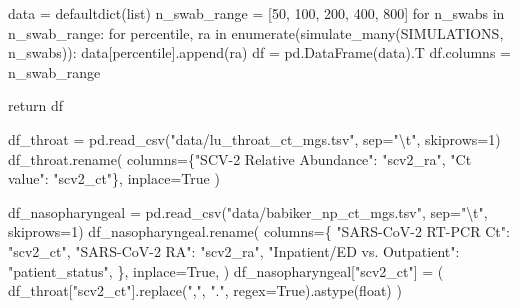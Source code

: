 \documentclass[
  letterpaper,
  DIV=11,
  numbers=noendperiod]{scrartcl}
\newenvironment{Shaded}{\begin{snugshade}}{\end{snugshade}}
\newcommand{\BuiltInTok}[1]{\textcolor[rgb]{0.00,0.23,0.31}{#1}}
\newcommand{\CharTok}[1]{\textcolor[rgb]{0.13,0.47,0.30}{#1}}
\newcommand{\ControlFlowTok}[1]{\textcolor[rgb]{0.00,0.23,0.31}{#1}}
\newcommand{\DecValTok}[1]{\textcolor[rgb]{0.68,0.00,0.00}{#1}}
\newcommand{\KeywordTok}[1]{\textcolor[rgb]{0.00,0.23,0.31}{#1}}
\newcommand{\NormalTok}[1]{\textcolor[rgb]{0.00,0.23,0.31}{#1}}
\newcommand{\OperatorTok}[1]{\textcolor[rgb]{0.37,0.37,0.37}{#1}}
\newcommand{\StringTok}[1]{\textcolor[rgb]{0.13,0.47,0.30}{#1}}
\newcommand{\VariableTok}[1]{\textcolor[rgb]{0.07,0.07,0.07}{#1}}
\begin{document}
\begin{Shaded}
\begin{Highlighting}[]
\NormalTok{    data }\OperatorTok{=}\NormalTok{ defaultdict(}\BuiltInTok{list}\NormalTok{)}
\NormalTok{    n\_swab\_range }\OperatorTok{=}\NormalTok{ [}\DecValTok{50}\NormalTok{, }\DecValTok{100}\NormalTok{, }\DecValTok{200}\NormalTok{, }\DecValTok{400}\NormalTok{, }\DecValTok{800}\NormalTok{]}
    \ControlFlowTok{for}\NormalTok{ n\_swabs }\KeywordTok{in}\NormalTok{ n\_swab\_range:}
        \ControlFlowTok{for}\NormalTok{ percentile, ra }\KeywordTok{in} \BuiltInTok{enumerate}\NormalTok{(simulate\_many(SIMULATIONS, n\_swabs)):}
\NormalTok{            data[percentile].append(ra)}
\NormalTok{    df }\OperatorTok{=}\NormalTok{ pd.DataFrame(data).T}
\NormalTok{    df.columns }\OperatorTok{=}\NormalTok{ n\_swab\_range}

    \ControlFlowTok{return}\NormalTok{ df}


\NormalTok{df\_throat }\OperatorTok{=}\NormalTok{ pd.read\_csv(}\StringTok{"data/lu\_throat\_ct\_mgs.tsv"}\NormalTok{, sep}\OperatorTok{=}\StringTok{"}\CharTok{\textbackslash{}t}\StringTok{"}\NormalTok{, skiprows}\OperatorTok{=}\DecValTok{1}\NormalTok{)}
\NormalTok{df\_throat.rename(}
\NormalTok{    columns}\OperatorTok{=}\NormalTok{\{}\StringTok{"SCV{-}2 Relative Abundance"}\NormalTok{: }\StringTok{"scv2\_ra"}\NormalTok{, }\StringTok{"Ct value"}\NormalTok{: }\StringTok{"scv2\_ct"}\NormalTok{\}, inplace}\OperatorTok{=}\VariableTok{True}
\NormalTok{)}

\NormalTok{df\_nasopharyngeal }\OperatorTok{=}\NormalTok{ pd.read\_csv(}\StringTok{"data/babiker\_np\_ct\_mgs.tsv"}\NormalTok{, sep}\OperatorTok{=}\StringTok{"}\CharTok{\textbackslash{}t}\StringTok{"}\NormalTok{, skiprows}\OperatorTok{=}\DecValTok{1}\NormalTok{)}
\NormalTok{df\_nasopharyngeal.rename(}
\NormalTok{    columns}\OperatorTok{=}\NormalTok{\{}
        \StringTok{"SARS{-}CoV{-}2 RT{-}PCR Ct"}\NormalTok{: }\StringTok{"scv2\_ct"}\NormalTok{,}
        \StringTok{"SARS{-}CoV{-}2 RA"}\NormalTok{: }\StringTok{"scv2\_ra"}\NormalTok{,}
        \StringTok{"Inpatient/ED vs. Outpatient"}\NormalTok{: }\StringTok{"patient\_status"}\NormalTok{,}
\NormalTok{    \},}
\NormalTok{    inplace}\OperatorTok{=}\VariableTok{True}\NormalTok{,}
\NormalTok{)}
\NormalTok{df\_nasopharyngeal[}\StringTok{"scv2\_ct"}\NormalTok{] }\OperatorTok{=}\NormalTok{ (}
\NormalTok{    df\_throat[}\StringTok{"scv2\_ct"}\NormalTok{].replace(}\StringTok{","}\NormalTok{, }\StringTok{"."}\NormalTok{, regex}\OperatorTok{=}\VariableTok{True}\NormalTok{).astype(}\BuiltInTok{float}\NormalTok{)}
\NormalTok{)}


\end{Highlighting}
\end{Shaded}
\end{document}
